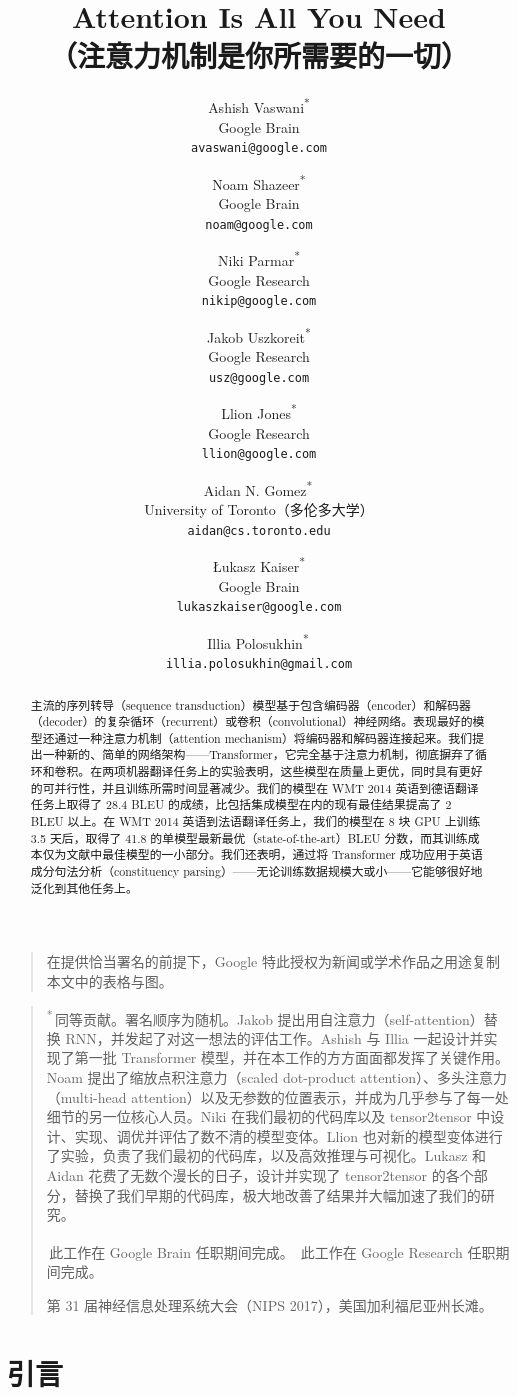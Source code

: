 \documentclass[11pt,UTF8,fontset=fandol]{ctexart}
\title{\textbf{Attention Is All You Need\\（注意力机制是你所需要的一切）}}
\author{%
Ashish Vaswani\textsuperscript{*}\\ Google Brain\\ \texttt{avaswani@google.com}
\and
Noam Shazeer\textsuperscript{*}\\ Google Brain\\ \texttt{noam@google.com}
\and
Niki Parmar\textsuperscript{*}\\ Google Research\\ \texttt{nikip@google.com}
\and
Jakob Uszkoreit\textsuperscript{*}\\ Google Research\\ \texttt{usz@google.com}
\and
Llion Jones\textsuperscript{*}\\ Google Research\\ \texttt{llion@google.com}
\and
Aidan N. Gomez\textsuperscript{*\,\dag}\\ University of Toronto（多伦多大学）\\ \texttt{aidan@cs.toronto.edu}
\and
{\L}ukasz Kaiser\textsuperscript{*}\\ Google Brain\\ \texttt{lukaszkaiser@google.com}
\and
Illia Polosukhin\textsuperscript{*\,\ddag}\\[0.3em] \texttt{illia.polosukhin@gmail.com}
}
\date{}
\begin{document}
\maketitle

\begin{quote}\small
在提供恰当署名的前提下，Google 特此授权为新闻或学术作品之用途复制本文中的表格与图。
\end{quote}

\begin{abstract}
主流的序列转导（sequence transduction）模型基于包含编码器（encoder）和解码器（decoder）的复杂循环（recurrent）或卷积（convolutional）神经网络。表现最好的模型还通过一种注意力机制（attention mechanism）将编码器和解码器连接起来。我们提出一种新的、简单的网络架构——Transformer，它完全基于注意力机制，彻底摒弃了循环和卷积。在两项机器翻译任务上的实验表明，这些模型在质量上更优，同时具有更好的可并行性，并且训练所需时间显著减少。我们的模型在 WMT 2014 英语到德语翻译任务上取得了 28.4 BLEU 的成绩，比包括集成模型在内的现有最佳结果提高了 2 BLEU 以上。在 WMT 2014 英语到法语翻译任务上，我们的模型在 8 块 GPU 上训练 3.5 天后，取得了 41.8 的单模型最新最优（state-of-the-art）BLEU 分数，而其训练成本仅为文献中最佳模型的一小部分。我们还表明，通过将 Transformer 成功应用于英语成分句法分析（constituency parsing）——无论训练数据规模大或小——它能够很好地泛化到其他任务上。
\end{abstract}

\begin{quote}\small
\textsuperscript{*}\,同等贡献。署名顺序为随机。Jakob 提出用自注意力（self-attention）替换 RNN，并发起了对这一想法的评估工作。Ashish 与 Illia 一起设计并实现了第一批 Transformer 模型，并在本工作的方方面面都发挥了关键作用。Noam 提出了缩放点积注意力（scaled dot-product attention）、多头注意力（multi-head attention）以及无参数的位置表示，并成为几乎参与了每一处细节的另一位核心人员。Niki 在我们最初的代码库以及 tensor2tensor 中设计、实现、调优并评估了数不清的模型变体。Llion 也对新的模型变体进行了实验，负责了我们最初的代码库，以及高效推理与可视化。Lukasz 和 Aidan 花费了无数个漫长的日子，设计并实现了 tensor2tensor 的各个部分，替换了我们早期的代码库，极大地改善了结果并大幅加速了我们的研究。

\textsuperscript{\dag}\,此工作在 Google Brain 任职期间完成。\quad
\textsuperscript{\ddag}\,此工作在 Google Research 任职期间完成。

第 31 届神经信息处理系统大会（NIPS 2017），美国加利福尼亚州长滩。
\end{quote}

\section{引言}
\end{document}
